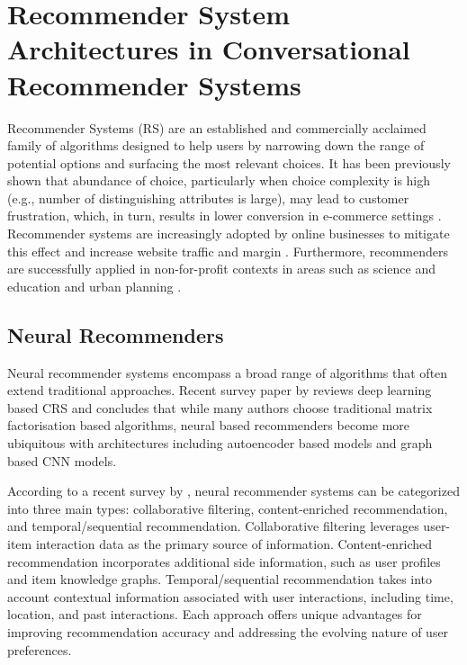 \section{Recommender System Architectures in Conversational Recommender Systems}

Recommender Systems (RS) are an established and commercially acclaimed family of algorithms designed to help users by narrowing down the range of potential options and surfacing the most relevant choices. It has been previously shown that abundance of choice, particularly when choice complexity is high (e.g., number of distinguishing attributes is large), may lead to customer frustration, which, in turn, results in lower conversion in e-commerce settings \citep{greifeneder2010less}. Recommender systems are increasingly adopted by online businesses to mitigate this effect and increase website traffic and margin \citep{zhao2013interactive}. Furthermore, recommenders are successfully applied in non-for-profit contexts in areas such as science and education \citep{chandrashekara2018fuzzy} and urban planning \citep{kucherbaev2017chatbots}.

\subsection{Neural Recommenders}

Neural recommender systems encompass a broad range of algorithms that often extend traditional approaches. Recent survey paper by \cite{sheng2022deep} reviews deep learning based CRS and concludes that while many authors choose traditional matrix factorisation based algorithms, neural based recommenders become more ubiquitous with architectures including autoencoder based models and graph based CNN models.

According to a recent survey by \cite{wu2022survey}, neural recommender systems can be categorized into three main types: collaborative filtering, content-enriched recommendation, and temporal/sequential recommendation. Collaborative filtering leverages user-item interaction data as the primary source of information. Content-enriched recommendation incorporates additional side information, such as user profiles and item knowledge graphs. Temporal/sequential recommendation takes into account contextual information associated with user interactions, including time, location, and past interactions. Each approach offers unique advantages for improving recommendation accuracy and addressing the evolving nature of user preferences.

